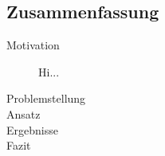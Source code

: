 \begin{otherlanguage}{ngerman}
\chapter*{Zusammenfassung}

\begin{description}
  \item[Motivation] Hi... 
  \item[Problemstellung] 

  \item[Ansatz] 

  \item[Ergebnisse] 

  \item[Fazit]
\end{description}
\end{otherlanguage}